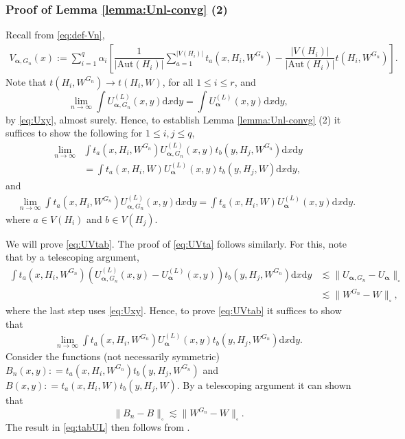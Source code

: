 \documentclass[11pt,reqno]{amsart}
\numberwithin{equation}{section}
\theoremstyle{definition}
\begin{document}
\subsubsection{Proof of Lemma \ref{lemma:Unl-convg} (2)} 

Recall from \eqref{eq:def-Vn}, 
\begin{align*}
    V_{\bm \alpha, G_n}(x) := \sum_{i=1}^{q}\alpha_{i}\left[\dfrac{1}{\left|\text{Aut}(H_{i})\right|}\sum_{a=1}^{|V(H_{i})|} t_{a}(x,H_{i},W^{G_{n}}) - \dfrac{|V(H_{i})|}{\left|\text{Aut}(H_{i})\right|}t(H_{i},W^{G_{n}})\right] .  
\end{align*} 
Note that $ t(H_{i},W^{G_{n}}) \rightarrow t(H_{i},W)$, for all $1 \leq i \leq r$, and 
$$\lim_{n \rightarrow \infty} \int U_{\bm \alpha, G_n}^{(L)}(x, y) \mathrm{d}x \mathrm {d} y = \int U_{\bm \alpha}^{(L)}(x, y) \mathrm{d}x \mathrm {d} y , $$ 
by \eqref{eq:Uxy}, almost surely. Hence, to establish Lemma \ref{lemma:Unl-convg} (2) it suffices to show the following for $1 \leq i, j\leq q$, 
\begin{align}\label{eq:UVtab}
\lim_{n \rightarrow \infty} & \int t_{a}(x,H_{i},W^{G_{n}}) U_{\bm \alpha, G_n}^{(L)}(x, y) t_{b}(y,H_{j},W^{G_{n}}) \mathrm{d}x \mathrm {d} y  \nonumber \\ 
&= \int t_{a}(x,H_{i},W) U_{\bm \alpha}^{(L)}(x, y) t_{b}(y,H_{j},W) \mathrm{d}x \mathrm {d} y , 
\end{align} 
and 
\begin{align}\label{eq:UVta}
& \lim_{n \rightarrow \infty} \int t_{a}(x,H_{i},W^{G_{n}}) U_{\bm \alpha, G_n}^{(L)}(x, y)  \mathrm{d}x \mathrm {d} y = \int t_{a}(x,H_{i},W) U_{\bm \alpha}^{(L)}(x, y)  \mathrm{d}x \mathrm {d} y .  
\end{align} 
where $a \in V(H_i)$ and $b \in V(H_j)$.

We will prove \eqref{eq:UVtab}. The proof of \eqref{eq:UVta} follows similarly. For this, note that by a telescoping argument, 
\begin{align} 
 \int t_{a}(x,H_{i},W^{G_{n}}) (U_{\bm \alpha, G_n}^{(L)}(x, y) - U_{\bm \alpha}^{(L)}(x, y)) t_{b}(y,H_{j},W^{G_{n}}) \mathrm{d}x \mathrm {d} y 
 & \lesssim \| U_{\bm \alpha, G_n} - U_{\bm \alpha} \|_{\square} \nonumber \\
 & \lesssim \| W^{G_{n}} - W \|_{\square}\nonumber, 
\end{align} 
where the last step uses \eqref{eq:Uxy}. Hence, to prove \eqref{eq:UVtab} it suffices to show that 
\begin{align} \label{eq:tabUL}
\lim_{n \rightarrow \infty }\int t_{a}(x,H_{i},W^{G_{n}}) U_{\bm \alpha}^{(L)}(x, y) t_{b}(y,H_{j},W^{G_{n}}) \mathrm{d}x \mathrm {d} y .
\end{align} 
Consider the functions (not necessarily symmetric) $B_{n}(x, y) : = t_{a}(x,H_{i},W^{G_{n}}) t_{b}(y,H_{j},W^{G_{n}})$ and $B(x, y) : = t_{a}(x,H_{i},W) t_{b}(y,H_{j},W)$. By a telescoping argument it can shown that 
$$\| B_{n} - B \|_{\square} \lesssim \| W^{G_{n}} - W \|_{\square}.$$
The result in \eqref{eq:tabUL} then follows from \cite[Lemma 8.22]{lovasz2012large}. 
\end{document}
